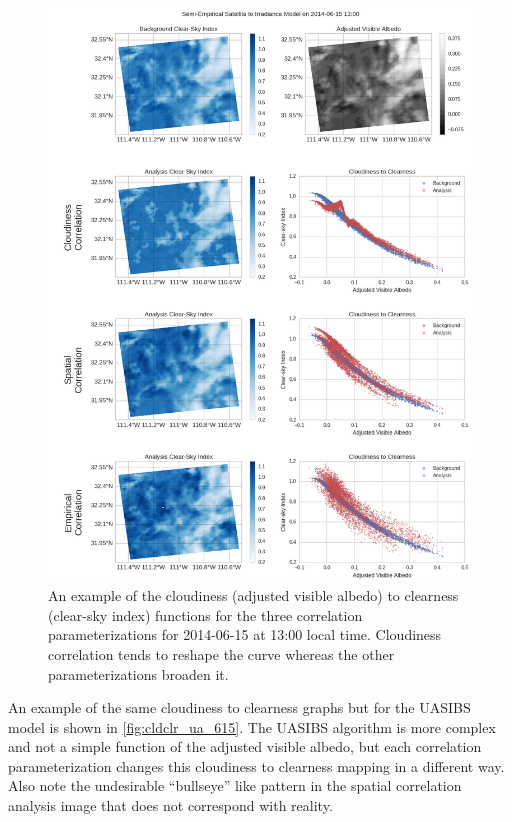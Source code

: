 \begin{figure}[p]
\centering
\includegraphics[width=.9\textwidth]{figs/cld_to_clear_Semi-Empirical_2014-06-15.png}
\caption[Clearness versus Cloudiness for SE model on 6/15]{An example
  of the cloudiness (adjusted visible albedo) to clearness (clear-sky
  index) functions for the three correlation parameterizations for
  2014-06-15 at 13:00 local time. Cloudiness correlation tends to
  reshape the curve whereas the other parameterizations broaden it.}
\label{fig:cldclr_se_615}
\end{figure}

An example of the same cloudiness to clearness graphs but for the
UASIBS model is shown in \cref{fig:cldclr_ua_615}.
The UASIBS algorithm is more complex and not a simple function
of the adjusted visible albedo, but each correlation parameterization
changes this cloudiness to clearness mapping in a different way.
Also note the undesirable ``bullseye'' like pattern in the spatial
correlation analysis image that does not correspond with reality.

